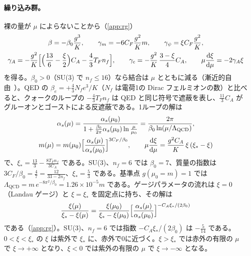 \documentclass[a4paper,10pt]{ltjsarticle}
\newcommand{\dd}{\mathrm{d}}
\begin{document}
\paragraph{繰り込み群。}裸の量が $\mu$ によらないことから（\ref{app:rg}）
\begin{equation}
\begin{gathered}
\beta=-\beta_0\frac{g^3}{K},\qquad
\gamma_m=-6C_F\frac{g^2}{K}m,\qquad
\gamma_\psi=\xi C_F\frac{g^2}{K},\\
\gamma_A=-\frac{g^2}{K}\Bigl[\Bigl(\frac{13}6-\frac\xi2\Bigr)C_A-\frac43T_Fn_f\Bigr],\qquad
\gamma_c=-\frac{g^2}{K}\,\frac{3-\xi}{4}C_A,\qquad
\mu\frac{\dd\xi}{\dd\mu}=-2\gamma_A\xi
\end{gathered}
\label{eq:rge}
\end{equation}
を得る。$\beta_0>0$（SU(3) で $n_f\le16$）なら結合は $\mu$ とともに減る（漸近的自由~\cite{gw73,politzer73}）。QED の $\beta_e=+\frac{4}{3}N_fe^3/K$（$N_f$ は電荷1の Dirac フェルミオンの数）と比べると、クォークのループの $-\frac43T_Fn_f$ は QED と同じ符号で遮蔽を表し、$\frac{11}3C_A$ がグルーオンとゴーストによる反遮蔽である。1ループの解は
\begin{equation}
\begin{gathered}
\alpha_s(\mu)=\frac{\alpha_s(\mu_0)}{1+\frac{\beta_0}{2\pi}\alpha_s(\mu_0)\ln\frac{\mu}{\mu_0}}=\frac{2\pi}{\beta_0\ln(\mu/\Lambda_{\mathrm{QCD}})},\\
m(\mu)=m(\mu_0)\Bigl[\frac{\alpha_s(\mu)}{\alpha_s(\mu_0)}\Bigr]^{3C_F/\beta_0},\qquad
\mu\frac{\dd\xi}{\dd\mu}=\frac{g^2C_A}{K}\,\xi\,(\xi_*-\xi)
\end{gathered}
\label{eq:run}
\end{equation}
で、$\xi_*=\frac{13}3-\frac{8T_Fn_f}{3C_A}$ である。SU(3)、$n_f=6$ では $\beta_0=7$、質量の指数は $3C_F/\beta_0=\frac47=\frac{12}{33-2n_f}$、$\xi_*=\frac53$ である。基準点 $g(\mu_0=m)=1$ では $\Lambda_{\mathrm{QCD}}=m\,e^{-8\pi^2/\beta_0}=1.26\times10^{-5}m$ である。ゲージパラメータの流れは $\xi=0$（Landau ゲージ）と $\xi=\xi_*$ を固定点に持ち、その解は
\begin{equation}
\frac{\xi(\mu)}{\xi_*-\xi(\mu)}=\frac{\xi(\mu_0)}{\xi_*-\xi(\mu_0)}\Bigl[\frac{\alpha_s(\mu)}{\alpha_s(\mu_0)}\Bigr]^{-C_A\xi_*/(2\beta_0)}
\label{eq:xisol}
\end{equation}
である（\ref{app:rg}）。SU(3)、$n_f=6$ では指数 $-C_A\xi_*/(2\beta_0)$ は $-\frac5{14}$ である。$0<\xi<\xi_*$ の $\xi$ は紫外で $\xi_*$ に、赤外で0に近づく。$\xi>\xi_*$ では赤外の有限の $\mu$ で $\xi\to+\infty$ となり、$\xi<0$ では紫外の有限の $\mu$ で $\xi\to-\infty$ となる。
\end{document}
